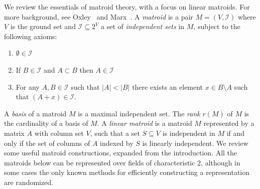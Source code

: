 \documentclass{theoretics}
\newcommand{\cI}{\ensuremath{\mathcal I}\xspace}
\begin{document}
We review the essentials of matroid theory, with a focus on linear
matroids. For more background, see Oxley~\cite{OxleyBook}
and Marx~\cite{Marx09-matroid}.
A \emph{matroid} is a pair $M=(V,\cI)$ where $V$ is the ground set 
and $\cI \subseteq 2^V$ a set of \emph{independent sets} in
$M$, subject to the following axioms:
\begin{enumerate}
\item $\emptyset \in \cI$
\item If $B \in \cI$ and $A \subset B$ then $A \in \cI$
\item For any $A, B \in \cI$ such that $|A|<|B|$ there exists an
  element $x \in B \setminus A$ such that $(A+x) \in \cI$.
\end{enumerate}
A \emph{basis} of a matroid $M$ is a maximal independent set.
The \emph{rank} $r(M)$ of $M$ is the cardinality of a basis of $M$. 
A \emph{linear matroid} is a matroid $M$ represented by a matrix $A$ with
column set $V$, such that a set $S \subseteq V$ is independent in $M$
if and only if the set of columns of $A$ indexed by $S$ is linearly independent.
We review some useful matroid constructions, expanded from the introduction.
All the matroids below can be represented over fields of characteristic 2,
although in some cases the only known methods for efficiently constructing a
representation are randomized.
\end{document}
